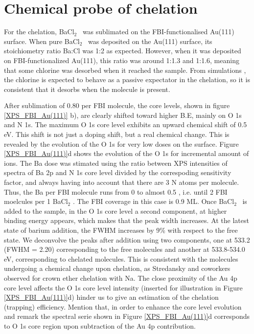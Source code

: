 \documentclass[aps,prl,reprint,longbibliography,superscriptaddress, english]{revtex4-1}
\def\BappCl{BaCl$_2$ }
\begin{document}
\section{Chemical probe of chelation}
For the chelation, \BappCl\ was sublimated on the FBI-functionalised Au(111) surface. When pure \BappCl\ was deposited on the Au(111) surface, its stoichiometry ratio Ba:Cl was 1:2 as expected. However, when it was deposited on FBI-functionalized Au(111), this ratio was around 1:1.3 and 1:1.6, meaning that some chlorine was desorbed when it reached the sample. From simulations \cite{rivilla_fluorescent_2020}, the chlorine is expected to behave as a passive expectator in the chelation, so it is consistent that it desorbs when the molecule is present.


After sublimation of 0.80 \Bapp per FBI molecule, the core levels, shown in figure \ref{XPS_FBI_Au(111)} b), are clearly shifted toward higher B.E, mainly on O 1s and N 1s. The maximum O 1s core level exhibits an upward chemical shift of 0.5 eV. This shift is not just a doping shift, but a real chemical change. This is revealed by the evolution of the O 1s for very low \Bapp doses on the surface. Figure \ref{XPS_FBI_Au(111)}d shows the evolution of the O 1s for incremental amount of \Bapp ions. The Ba dose was stimated using the ratio between XPS intensities of spectra of Ba 2p and N 1s core level divided by the correspoding sensitivity factor, and always having into account that there are 3 N atoms per molecule. Thus, the Ba per FBI molecule runs from 0 to almost 0.5 , i.e. until 2 FBI moelcules per 1 \BappCl. The FBI coverage in this case is 0.9 ML. Once \BappCl\ is added to the sample, in the O 1s core level a second component, at higher binding energy appears, which makes that the peak width increases. At the latest state of barium addition, the FWHM increases by 9\% with respect to the free state. We deconvolve the peaks after \Bapp addition using two components, one at 533.2 (FWHM = 2.20) corresponding to the free molecules and another at 533.8-534.0 eV, corresponding to chelated molecules. This is consistent with the molecules undergoing a chemical change upon chelation, as Stredansky and coworkers observed for crown ether chelation with Na.\cite{stredansky_-surface_2019}  The close proximity of the Au 4p core level affects the O 1s core level intensity (inserted for illustration in Figure \ref{XPS_FBI_Au(111)}d) hinder us to give an estimation of the chelation (trapping) efficiency. Mention that, in order to enhance the core level evolution and remark the spectral serie shown in Figure \ref{XPS_FBI_Au(111)}d corresponds to O 1s core region upon subtraction of the Au 4p contribution. 
\end{document}
